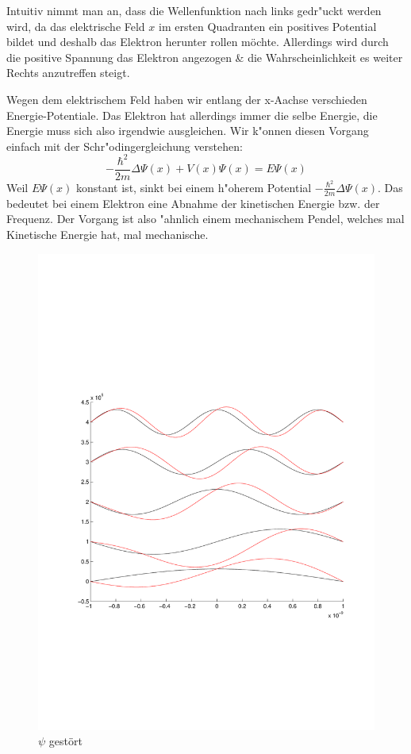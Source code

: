 \begin{refsection}
Intuitiv nimmt man an, dass die Wellenfunktion nach links gedr"uckt werden wird, da das
elektrische Feld $x$ im ersten Quadranten ein positives Potential bildet
und deshalb das Elektron herunter rollen m\"ochte.
Allerdings wird durch die positive Spannung das Elektron angezogen \& die
Wahrscheinlichkeit es weiter Rechts anzutreffen steigt.

Wegen dem elektrischem Feld haben wir entlang der x-Aachse verschieden Energie-Potentiale.
Das Elektron hat allerdings immer die selbe Energie,
die Energie muss sich also irgendwie ausgleichen.
Wir k"onnen diesen Vorgang einfach mit der Schr"odingergleichung verstehen:
\[
-\frac{\hbar^2}{2m}\Delta\Psi(x) + V(x)\Psi(x)
=
E \Psi(x)
\]
Weil $E \Psi(x)$ konstant ist, sinkt bei einem h"oherem Potential $-\frac{\hbar^2}{2m}\Delta\Psi(x)$.
Das bedeutet bei einem Elektron eine Abnahme der kinetischen Energie bzw. der Frequenz.
Der Vorgang ist also "ahnlich einem mechanischem Pendel, welches mal Kinetische Energie hat, mal mechanische.

\begin{figure}
 \centering
 \includegraphics[width=12cm,clip=true,trim=2cm 7cm 1cm 8cm]{efeld/Psi_gestoert.pdf}
 \caption{$\psi$ gest\"ort}
 \label{abb:efeld_psi_gestoert}
\end{figure}




\end{refsection}
